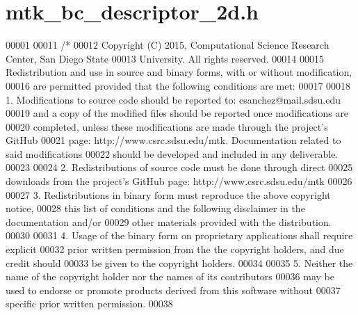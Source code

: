 \hypertarget{mtk__bc__descriptor__2d_8h_source}{\section{mtk\+\_\+bc\+\_\+descriptor\+\_\+2d.\+h}
\label{mtk__bc__descriptor__2d_8h_source}
}

\begin{DoxyCode}
00001 
00011 \textcolor{comment}{/*}
00012 \textcolor{comment}{Copyright (C) 2015, Computational Science Research Center, San Diego State}
00013 \textcolor{comment}{University. All rights reserved.}
00014 \textcolor{comment}{}
00015 \textcolor{comment}{Redistribution and use in source and binary forms, with or without modification,}
00016 \textcolor{comment}{are permitted provided that the following conditions are met:}
00017 \textcolor{comment}{}
00018 \textcolor{comment}{1. Modifications to source code should be reported to: esanchez@mail.sdsu.edu}
00019 \textcolor{comment}{and a copy of the modified files should be reported once modifications are}
00020 \textcolor{comment}{completed, unless these modifications are made through the project's GitHub}
00021 \textcolor{comment}{page: http://www.csrc.sdsu.edu/mtk. Documentation related to said modifications}
00022 \textcolor{comment}{should be developed and included in any deliverable.}
00023 \textcolor{comment}{}
00024 \textcolor{comment}{2. Redistributions of source code must be done through direct}
00025 \textcolor{comment}{downloads from the project's GitHub page: http://www.csrc.sdsu.edu/mtk}
00026 \textcolor{comment}{}
00027 \textcolor{comment}{3. Redistributions in binary form must reproduce the above copyright notice,}
00028 \textcolor{comment}{this list of conditions and the following disclaimer in the documentation and/or}
00029 \textcolor{comment}{other materials provided with the distribution.}
00030 \textcolor{comment}{}
00031 \textcolor{comment}{4. Usage of the binary form on proprietary applications shall require explicit}
00032 \textcolor{comment}{prior written permission from the the copyright holders, and due credit should}
00033 \textcolor{comment}{be given to the copyright holders.}
00034 \textcolor{comment}{}
00035 \textcolor{comment}{5. Neither the name of the copyright holder nor the names of its contributors}
00036 \textcolor{comment}{may be used to endorse or promote products derived from this software without}
00037 \textcolor{comment}{specific prior written permission.}
00038 \textcolor{comment}{}

\end{DoxyCode}
